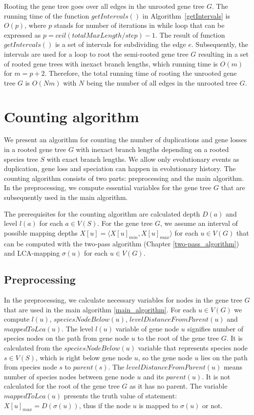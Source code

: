 Rooting the gene tree goes over all edges in the unrooted gene tree $G$. The running time of the function $getIntervals()$ in Algorithm~\ref{getIntervals} is $O(p)$, where $p$ stands for number of iterations in while loop that can be expressed as $p = ceil(totalMaxLength/step) - 1$. The result of function $getIntervals()$ is a set of intervals for subdividing the edge $e$. Subsequently, the intervals are used for a loop to root the semi-rooted gene tree $G$ resulting in a set of rooted gene trees with inexact branch lengths, which running time is $O(m)$ for $m = p+2$. Therefore, the total running time of rooting the unrooted gene tree $G$ is $O(Nm)$ with $N$ being the number of all edges in the unrooted tree $G$.




\section{Counting algorithm}

We present an algorithm for counting the number of duplications and gene losses in a rooted gene tree $G$ with inexact branch lengths depending on a rooted species tree $S$ with exact branch lengths. We allow only evolutionary events as duplication, gene loss and speciation can happen in evolutionary history. The counting algorithm consists of two parts: preprocessing and the main algorithm. In the preprocessing, we compute essential variables for the gene tree $G$ that are subsequently used in the main algorithm.

The prerequisites for the counting algorithm are calculated depth $D(a)$ and level $l(a)$ for each $a \in V(S)$. For the gene tree $G$, we assume an interval of possible mapping depths $X[u] = \langle X[u]_{min}, X[u]_{max} \rangle$ for each $u \in V(G)$ that can be computed with the two-pass algorithm (Chapter \ref{two-pass_algorithm}) and LCA-mapping $\sigma(u)$ for each $u \in V(G)$.

\subsection{Preprocessing}

In the preprocessing, we calculate necessary variables for nodes in the gene tree $G$ that are used in the main algorithm \ref{main_algorithm}. For each $u \in V(G)$ we compute $l(u)$, $speciesNodeBelow(u)$, $levelDistanceFromParent(u)$ and $mappedToLca(u)$. The level $l(u)$ variable of gene node $u$ signifies number of species nodes on the path from gene node $u$ to the root of the gene tree $G$. It is calculated from the $speciesNodeBelow(u)$ variable that represents species node $s \in V(S)$, which is right below gene node $u$, so the gene node $u$ lies on the path from species node $s$ to $parent(s)$. The $levelDistanceFromParent(u)$ means number of species nodes between gene node $u$ and its $parent(u)$. It is not calculated for the root of the gene tree $G$ as it has no parent. The variable $mappedToLca(u)$ presents the truth value of statement: $X[u]_{max} = D(\sigma(u))$, thus if the node $u$ is mapped to $\sigma(u)$ or not. 

